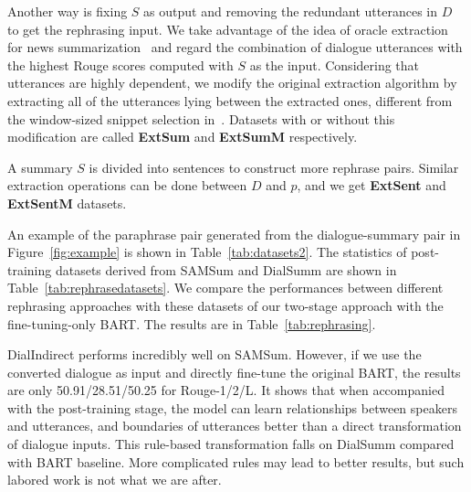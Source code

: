 Another way is fixing $S$ as output and removing the redundant utterances in $D$ to get the rephrasing input. We take advantage of the idea of oracle extraction for news summarization~\cite{zhou-etal-2018-neural-document} and regard the combination of dialogue utterances with the highest Rouge scores computed with $S$ as the input. 
Considering that utterances are highly dependent, we modify the original extraction algorithm by extracting all of the utterances lying between the extracted ones, 
different from the window-sized snippet selection in~\cite{liu-etal-2021-topic-aware}.  Datasets with or without this modification are called \textbf{ExtSum} and \textbf{ExtSumM} respectively.

A summary $S$ is divided into sentences to construct more rephrase pairs.
Similar extraction operations can be done between $D$ and $p$, and we 
get \textbf{ExtSent} and \textbf{ExtSentM} datasets.

An example of the paraphrase pair generated from the dialogue-summary pair 
in Figure~\ref{fig:example} is shown
in Table~\ref{tab:datasets2}.
The statistics of post-training datasets derived from SAMSum and DialSumm are shown in Table~\ref{tab:rephrasedatasets}. We compare the performances between different rephrasing approaches with these datasets of our two-stage approach with the fine-tuning-only BART. The results are in Table~\ref{tab:rephrasing}. 

DialIndirect performs incredibly well on SAMSum. However, if we use the converted dialogue as input and directly fine-tune the original BART, the results are only 50.91/28.51/50.25 for Rouge-1/2/L.
It shows that when accompanied with the post-training stage, the model can learn relationships between speakers and utterances, and boundaries of utterances better than a direct transformation of dialogue inputs. 
This rule-based transformation falls on DialSumm compared with BART baseline. More complicated rules may lead to better results, but such labored work is not what we are after. 

